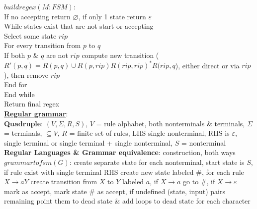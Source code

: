 \documentclass[a4paper]{article}
\begin{document}
\begin{multicols}{2}
        \boldmath$buildregex(M: FSM)$\unboldmath:\\
        If no accepting return $\varnothing$, if only 1 state return $\varepsilon$\\
        While states exist that are not start or accepting\\
        Select some state $rip$\\
        For every transition from $p$ to $q$\\
        If both $p$ \& $q$ are not $rip$ compute new transition ($R'(p,q) = R(p,q) \cup R(p,rip) {R(rip, rip)}^* R(rip, q$), either direct or via $rip$), then remove $rip$\\
        End for\\
        End while\\
        Return final regex\\
        \underline{\textbf{Regular grammar}}:\\
        \textbf{Quadruple}: $(V, \Sigma, R, S)$, $V$ = rule alphabet, both nonterminals \& terminals, $\Sigma$ = terminals, $\subseteq V$, $R$ = finite set of rules, LHS single nonterminal, RHS is $\varepsilon$, single terminal or single terminal + single nonterminal, $S$ = nonterminal\\
        \textbf{Regular Languages \& Grammar equivalence}: construction, both ways\\
        \boldmath$grammartofsm(G)$\unboldmath: create separate state for each nonterminal, start state is $S$, if rule exist with single terminal RHS create new state labeled \#, for each rule $X \to aY$ create transition from $X$ to $Y$ labeled $a$, if $X \to a$ go to \#, if $X \to \varepsilon$ mark as accept, mark state \# as accept, if undefined (state, input) pairs remaining point them to dead state \& add loops to dead state for each character\\
    \end{multicols}
    
\end{document}
